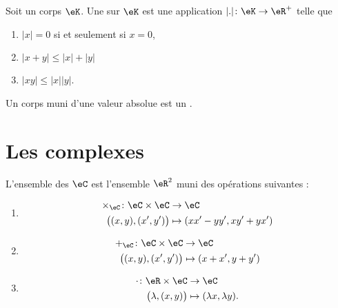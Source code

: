 \begin{definition}       \label{DEFooBWXXooAkBBRS}
    Soit un corps \( \eK\). Une  sur \(\eK\) est une application \( | . |\colon \eK\to \eR^+\) telle que
    \begin{enumerate}
        \item
            \( | x |=0\) si et seulement si \( x=0\),
        \item
            \( | x+y |\leq | x |+| y |\)
        \item
            \( | xy |\leq | x | | y |\).
    \end{enumerate}
    Un corps muni d'une valeur absolue est un .
\end{definition}


\section{Les complexes}

\begin{definition}
    L'ensemble des  \( \eC\) est l'ensemble \( \eR^2\) muni des opérations suivantes :
    \begin{enumerate}
        \item
            \begin{equation}        \label{EQooIJWOooZBiKEW}
                \begin{aligned}
                    \times_{\eC}\colon \eC\times \eC&\to \eC \\
                    \big( (x,y),(x',y') \big)&\mapsto (xx'-yy', xy'+yx') 
                \end{aligned}
            \end{equation}
        \item
            \begin{equation}
                \begin{aligned}
                    +_{\eC}\colon \eC\times \eC&\to \eC \\
                    \big( (x,y),(x',y') \big)&\mapsto (x+x', y+y') 
                \end{aligned}
            \end{equation}
        \item
            \begin{equation}
                \begin{aligned}
                    \cdot\colon \eR\times \eC&\to \eC \\
                    \big( \lambda,(x,y) \big)&\mapsto (\lambda x, \lambda y). 
                \end{aligned}
            \end{equation}
    \end{enumerate}
\end{definition}

